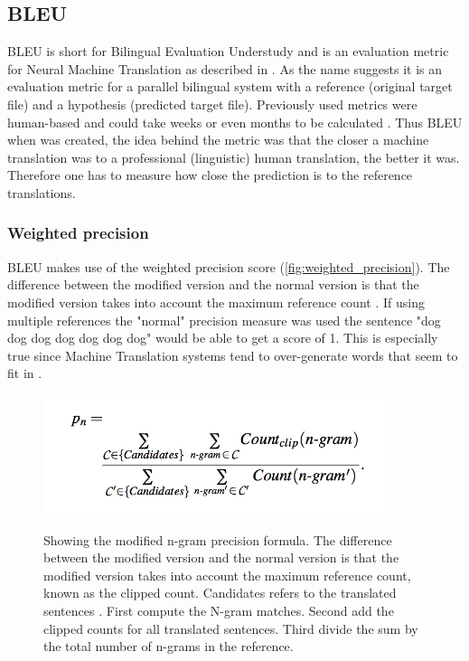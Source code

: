 \subsection{BLEU}

BLEU is short for Bilingual Evaluation Understudy and is an evaluation metric for Neural Machine Translation as described in \cite{papineni2002bleu}. As the name suggests it is an evaluation metric for a parallel bilingual system with a reference (original target file) and a hypothesis (predicted target file). Previously used metrics were human-based and could take weeks or even months to be calculated \cite{papineni2002bleu}. Thus BLEU when was created, the idea behind the metric was that the closer a machine translation was to a professional (linguistic) human translation, the better it was. Therefore one has to measure how close the prediction is to the reference translations.

\subsubsection{Weighted precision}
BLEU makes use of the weighted precision score (\autoref{fig:weighted_precision}). The difference between the modified version and the normal version is that the modified version takes into account the maximum reference count \cite{chan}. If using multiple references the "normal" precision measure was used the sentence "dog dog dog dog dog dog dog" would be able to get a score of 1. This is especially true since Machine Translation systems tend to over-generate words that seem to fit in \cite{papineni2002bleu}.

\begin{figure}[h]
\caption{Showing the modified n-gram precision formula. The difference between the modified version and the normal version is that the modified version takes into account the maximum reference count, known as the clipped count. Candidates refers to the translated sentences \cite{chan} \cite{papineni2002bleu}. First compute the N-gram matches. Second add the clipped counts for all translated sentences. Third divide the sum by the total number of n-grams in the reference. \cite{chan}}
 \centering 
 \includegraphics[width=10cm]{Bachelor CSAI thesis template/images/weighted_precision.png}
 \label{fig:weighted_precision}
\end{figure}

